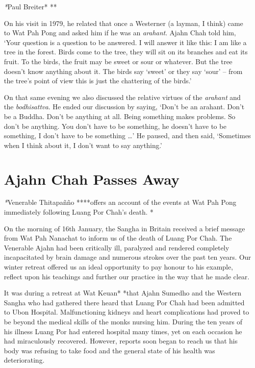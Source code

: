 \emph{*}Paul Breiter* **

On his visit in 1979, he related that once a Westerner (a layman, I
think) came to Wat Pah Pong and asked him if he was an \emph{arahant}.
Ajahn Chah told him, `Your question is a question to be answered. I will
answer it like this: I am like a tree in the forest. Birds come to the
tree, they will sit on its branches and eat its fruit. To the birds, the
fruit may be sweet or sour or whatever. But the tree doesn't know
anything about it. The birds say `sweet' or they say `sour' -- from the
tree's point of view this is just the chattering of the birds.'

On that same evening we also discussed the relative virtues of the
\emph{arahant} and the \emph{bodhisattva}. He ended our discussion by
saying, `Don't be an arahant. Don't be a Buddha. Don't be anything at
all. Being something makes problems. So don't be anything. You don't
have to be something, he doesn't have to be something, I don't have to
be something \ldots{}' He paused, and then said, `Sometimes when I think
about it, I don't want to say anything.'

\chapter{Ajahn Chah Passes Away}

\emph{*}Venerable Thitapañño ****offers an account of the events at Wat
Pah Pong immediately following Luang Por Chah's death. *

On the morning of 16th January, the Sangha in Britain received a brief
message from Wat Pah Nanachat to inform us of the death of Luang Por
Chah. The Venerable Ajahn had been critically ill, paralyzed and
rendered completely incapacitated by brain damage and numerous strokes
over the past ten years. Our winter retreat offered us an ideal
opportunity to pay honour to his example, reflect upon his teachings and
further our practice in the way that he made clear.

It was during a retreat at Wat Keuan* *that Ajahn Sumedho and the
Western Sangha who had gathered there heard that Luang Por Chah had been
admitted to Ubon Hospital. Malfunctioning kidneys and heart
complications had proved to be beyond the medical skills of the monks
nursing him. During the ten years of his illness Luang Por had entered
hospital many times, yet on each occasion he had miraculously recovered.
However, reports soon began to reach us that his body was refusing to
take food and the general state of his health was deteriorating.


